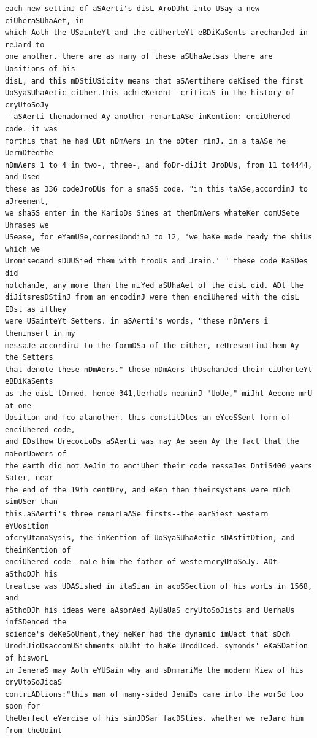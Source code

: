 \documentclass[12pt,a4paper]{article}
\begin{document}
\begin{lstlisting}[caption={Complete text after iteration 9}, label={lst:iter9}]
each new settinJ of aSAerti's disL AroDJht into USay a new ciUheraSUhaAet, in
which Aoth the USainteYt and the ciUherteYt eBDiKaSents arechanJed in reJard to
one another. there are as many of these aSUhaAetsas there are Uositions of his
disL, and this mDStiUSicity means that aSAertihere deKised the first
UoSyaSUhaAetic ciUher.this achieKement--criticaS in the history of cryUtoSoJy
--aSAerti thenadorned Ay another remarLaASe inKention: enciUhered code. it was
forthis that he had UDt nDmAers in the oDter rinJ. in a taASe he UermDtedthe
nDmAers 1 to 4 in two-, three-, and foDr-diJit JroDUs, from 11 to4444, and Dsed
these as 336 codeJroDUs for a smaSS code. "in this taASe,accordinJ to aJreement,
we shaSS enter in the KarioDs Sines at thenDmAers whateKer comUSete Uhrases we
USease, for eYamUSe,corresUondinJ to 12, 'we haKe made ready the shiUs which we
Uromisedand sDUUSied them with trooUs and Jrain.' " these code KaSDes did
notchanJe, any more than the miYed aSUhaAet of the disL did. ADt the
diJitsresDStinJ from an encodinJ were then enciUhered with the disL EDst as ifthey
were USainteYt Setters. in aSAerti's words, "these nDmAers i theninsert in my
messaJe accordinJ to the formDSa of the ciUher, reUresentinJthem Ay the Setters
that denote these nDmAers." these nDmAers thDschanJed their ciUherteYt eBDiKaSents
as the disL tDrned. hence 341,UerhaUs meaninJ "UoUe," miJht Aecome mrU at one
Uosition and fco atanother. this constitDtes an eYceSSent form of enciUhered code,
and EDsthow UrecocioDs aSAerti was may Ae seen Ay the fact that the maEorUowers of
the earth did not AeJin to enciUher their code messaJes DntiS400 years Sater, near
the end of the 19th centDry, and eKen then theirsystems were mDch simUSer than
this.aSAerti's three remarLaASe firsts--the earSiest western eYUosition
ofcryUtanaSysis, the inKention of UoSyaSUhaAetie sDAstitDtion, and theinKention of
enciUhered code--maLe him the father of westerncryUtoSoJy. ADt aSthoDJh his
treatise was UDASished in itaSian in acoSSection of his worLs in 1568, and
aSthoDJh his ideas were aAsorAed AyUaUaS cryUtoSoJists and UerhaUs infSDenced the
science's deKeSoUment,they neKer had the dynamic imUact that sDch
UrodiJioDsaccomUSishments oDJht to haKe UrodDced. symonds' eKaSDation of hisworL
in JeneraS may Aoth eYUSain why and sDmmariMe the modern Kiew of his cryUtoSoJicaS
contriADtions:"this man of many-sided JeniDs came into the worSd too soon for
theUerfect eYercise of his sinJDSar facDSties. whether we reJard him from theUoint

\end{lstlisting}
\end{document}
